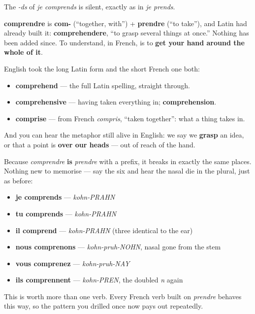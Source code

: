 The \emph{-ds} of \emph{je comprends} is silent, exactly as in \emph{je prends}.

\begin{cousinweb}
\textbf{comprendre} is \textbf{com-} (\textquotedblleft{}together, with\textquotedblright{}) + \textbf{prendre} (\textquotedblleft{}to take\textquotedblright{}), and Latin had already built it: \textbf{comprehendere}, \textquotedblleft{}to grasp several things at once.\textquotedblright{} Nothing has been added since. To understand, in French, is to \textbf{get your hand around the whole of it}.

English took the long Latin form and the short French one both:

\begin{itemize}
\raggedright
  \item \textbf{comprehend} — the full Latin spelling, straight through.
  \item \textbf{comprehensive} — having taken everything in; \textbf{comprehension}.
  \item \textbf{comprise} — from French \emph{compris}, \textquotedblleft{}taken together\textquotedblright{}: what a thing takes in.
\end{itemize}

And you can hear the metaphor still alive in English: we say we \textbf{grasp} an idea, or that a point is \textbf{over our heads} — out of reach of the hand.
\end{cousinweb}

\begin{grammarlens}[title={Grammar Lens: the same verb, so the same forms}]
Because \emph{comprendre} \textbf{is} \emph{prendre} with a prefix, it breaks in exactly the same places. Nothing new to memorise — say the six and hear the nasal die in the plural, just as before:

\begin{itemize}
\raggedright
  \item \textbf{je comprends} — \emph{kohn-PRAHN}
  \item \textbf{tu comprends} — \emph{kohn-PRAHN}
  \item \textbf{il comprend} — \emph{kohn-PRAHN} (three identical to the ear)
  \item \textbf{nous comprenons} — \emph{kohn-pruh-NOHN}, nasal gone from the stem
  \item \textbf{vous comprenez} — \emph{kohn-pruh-NAY}
  \item \textbf{ils comprennent} — \emph{kohn-PREN}, the doubled \emph{n} again
\end{itemize}

This is worth more than one verb. Every French verb built on \emph{prendre} behaves this way, so the pattern you drilled once now pays out repeatedly.
\end{grammarlens}

